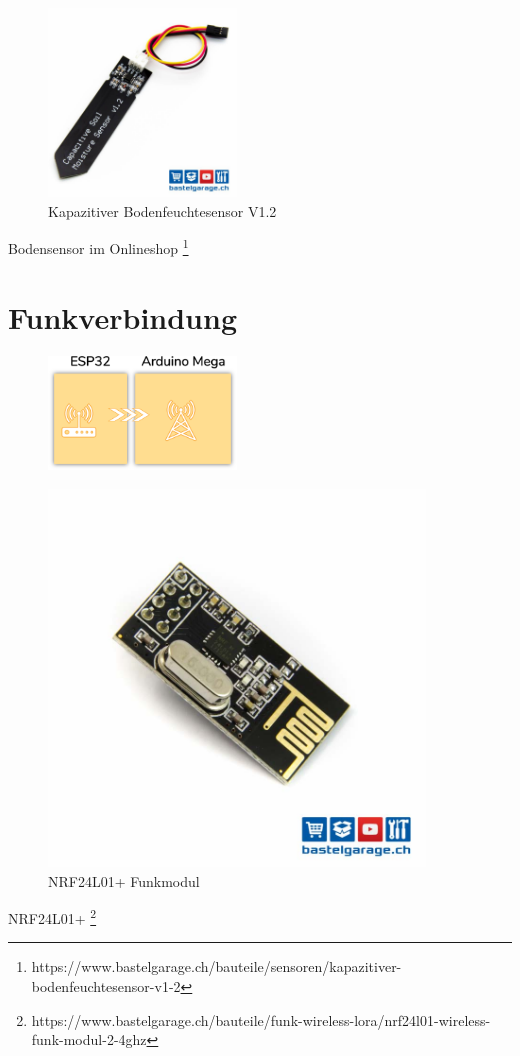 \documentclass[
  10pt, %
  a4paper, %
  twoside, %
  openright, %
  numbers=noenddot, %
  BCOR=5mm, %
  parskip=half*, %
  thesis, %
]{bfhbook}
\begin{document}
 \begin{figure}[htp]
  \begin{center}
    \includegraphics[width=5cm, left]{Bilder/Soil-2.jpg}
  \end{center}
    \caption{Kapazitiver Bodenfeuchtesensor V1.2}
  \label{fig:soil1.2}
\end{figure}
Bodensensor im Onlineshop \footnote{https://www.bastelgarage.ch/bauteile/sensoren/kapazitiver-bodenfeuchtesensor-v1-2}

 \section{Funkverbindung}
 \begin{figure}[htp]
  \begin{center}
    \includegraphics[width=5cm, left]{Bilder/ESP32-Arduino.png}
  \end{center}
\end{figure}

  \begin{figure}[htp]
  \begin{center}
    \includegraphics[width=10cm, left]{Bilder/NRF24.jpg}
  \end{center}
    \caption{NRF24L01+ Funkmodul}
  \label{fig:dhtnrf24}
\end{figure}
NRF24L01+ \footnote{https://www.bastelgarage.ch/bauteile/funk-wireless-lora/nrf24l01-wireless-funk-modul-2-4ghz}
 
\end{document}
